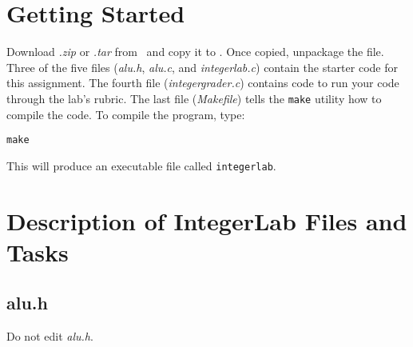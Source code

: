 \section{Getting Started}

Download \textit{\shortlabname.zip} or \textit{\shortlabname.tar} from
\filesource\ and copy it to \runtimeenvironment. Once copied, unpackage the
file. Three of the five files (\textit{alu.h}, \textit{alu.c}, and
\textit{integerlab.c}) contain the starter code for this assignment. The fourth
file (\textit{integergrader.c}) contains code to run your code through the lab's
rubric. The last file (\textit{Makefile}) tells the \texttt{make} utility how
to compile the code. To compile the program, type:

\texttt{make}

This will produce an executable file called \texttt{integerlab}.
%

\section{Description of IntegerLab Files and Tasks}

\subsection{alu.h}

Do not edit \textit{alu.h}.

